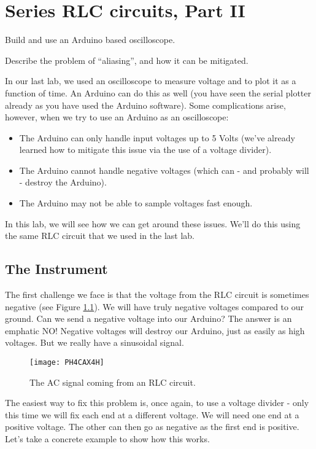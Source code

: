 \chapter{Series RLC circuits, Part II}

\objectives
{
\item Build and use an Arduino based oscilloscope.
\item Describe the problem of ``aliasing'', and how it can be mitigated.
}

In our last lab, we used an oscilloscope to measure voltage and to plot it
as a function of time. An Arduino can do this as well (you have seen the
serial plotter already as you have used the Arduino software). 
Some complications arise, however, when we try to use an Arduino as an 
oscilloscope:
\begin{itemize}
	\item The Arduino can only handle input voltages up to 5 Volts
		(we've already learned how to mitigate this issue via the
		use of a voltage divider).
	\item The Arduino cannot handle negative voltages (which can - and
		probably will - destroy the Arduino).
	\item The Arduino may not be able to sample voltages fast enough.
\end{itemize}
In this lab, we will see how we can get around these issues. We'll do this 
using the same RLC circuit that we used in the last lab.

\section{The Instrument}

The first challenge we face is that the voltage from the RLC circuit is
sometimes negative (see Figure \ref{fig:rlc_signal}).
We will have truly negative voltages compared to our ground. Can
we send a negative voltage into our Arduino? The answer is an emphatic NO!
Negative voltages will destroy our Arduino, just as easily as high
voltages. But we really have a
sinusoidal signal. 
\begin{figure}[htbp!]
\centering
\texttt{[image: PH4CAX4H]}
	\caption{The AC signal coming from an RLC circuit.}
	\label{fig:rlc_signal}
\end{figure}

The easiest way to fix this problem is, once again, to use a voltage
divider - only this time we will fix each end at a different voltage. We will
need one end at a positive voltage. The other can then go as negative as the
first end is positive. Let's take a concrete example to show how this works.

